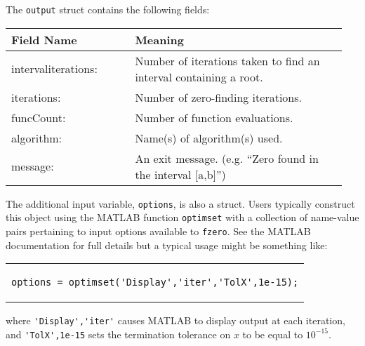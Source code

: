 \begin{itemize}
The  \lstinline[style=myMatlab]{output} struct contains the following fields:
\begin{center}
\begin{tabular}{|p{0.35\linewidth} | p{0.6\linewidth}|}
\hline
\textbf{Field Name} & \textbf{Meaning} \\ \hline
intervaliterations: & Number of iterations taken to find an interval containing a root. \\
iterations: & Number of zero-finding iterations. \\
funcCount: & Number of function evaluations. \\ 
algorithm: & Name(s) of algorithm(s) used. \\
message: & An exit message. (e.g. ``Zero found in the interval [a,b]'')\\
\hline
\end{tabular}
\end{center}


\end{itemize} 

The additional input variable, \lstinline[style=myMatlab]{options}, is also a struct. Users typically construct this object using the MATLAB function \lstinline[style=myMatlab]{optimset} with a collection of name-value pairs pertaining to input options available to \lstinline[style=myMatlab]{fzero}.  See the MATLAB documentation for full details but a typical usage might be something like:

\begin{center}
\begin{tabular}{c}
\begin{lstlisting}[style=myMatlab, frame=none, numbers=none, basicstyle=\small]
options = optimset('Display','iter','TolX',1e-15);
\end{lstlisting}
\end{tabular}
\end{center}
where \lstinline[style=myMatlab]{'Display','iter'} causes MATLAB to display output at each iteration, and \lstinline[style=myMatlab]{'TolX',1e-15} sets the termination tolerance on $x$ to be equal to $10^{-15}$.


  



